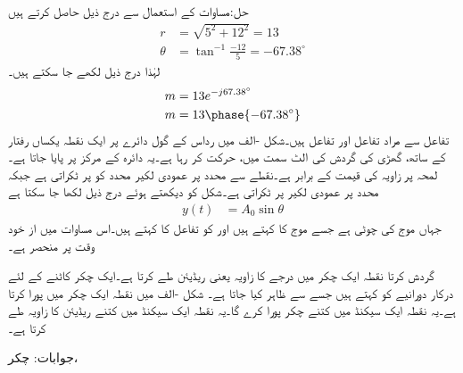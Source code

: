حل:مساوات  کے استعمال سے درج ذیل حاصل کرتے ہیں
\begin{align*}
r&=\sqrt{5^2+12^2}=13\\
\theta&=\tan^{-1}\frac{-12}{5}=-67.38^{\circ}
\end{align*}
لہٰذا درج ذیل لکھے جا سکتے ہیں۔
\begin{align*}
m&=13 e^{-j67.38^{\circ}}\\
m&=13\phase{-67.38^{\circ}}
\end{align*}
 تفاعل سے مراد  تفاعل  اور  تفاعل  ہیں۔شکل -الف میں رداس  کے گول دائرے پر ایک نقطہ یکساں رفتار کے ساتھ، گھڑی کی گردش کی الٹ سمت میں، حرکت کر رہا ہے۔یہ دائرہ  کے مرکز  پر پایا جاتا ہے۔لمحہ  پر زاویہ  کی قیمت  کے برابر ہے۔نقطے سے  محدد پر عمودی لکیر محدد کو    پر ٹکراتی ہے جبکہ  محدد پر عمودی لکیر  پر ٹکراتی ہے۔شکل کو دیکھتے ہوئے درج ذیل لکھا جا سکتا ہے
\begin{align}\label{مساوات_بدلتا_سائن_نما_تفاعل_الف}
y(t)&=A_0 \sin \theta
\end{align}
جہاں  موج کی چوٹی ہے جسے موج کا  کہتے ہیں اور  کو تفاعل کا  کہتے ہیں۔اس مساوات میں  از خود وقت پر منحصر ہے۔

 گردش کرتا نقطہ ایک چکر میں  درجے کا زاویہ یعنی  ریڈیئن طے کرتا ہے۔ایک چکر کاٹنے کے لئے درکار دورانیے کو  کہتے ہیں جسے  سے ظاہر کیا جاتا ہے۔
شکل -الف میں نقطہ ایک چکر  میں پورا کرتا ہے۔یہ نقطہ ایک سیکنڈ میں کتنے چکر پورا کرے گا۔یہ نقطہ ایک سیکنڈ میں کتنے ریڈیئن کا زاویہ طے کرتا ہے۔

جوابات: چکر، 

